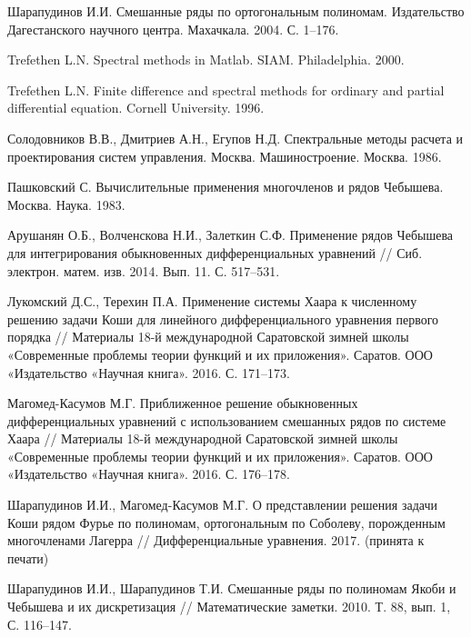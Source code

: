 \begin{thebibliography}{1}
{Шарапудинов И.И.}
Смешанные ряды по ортогональным полиномам. Издательство Дагестанского научного центра. Махачкала. 2004. С. 1--176.

{Trefethen L.N.}
Spectral methods in Matlab. SIAM. Philadelphia. 2000.

{Trefethen L.N.}
Finite difference and spectral methods for ordinary and partial differential equation. Cornell University. 1996.


{Солодовников В.В., Дмитриев А.Н., Егупов Н.Д.}
Спектральные методы расчета и проектирования систем управления. Москва. Машиностроение. Москва. 1986.

{Пашковский С.}
Вычислительные применения многочленов и рядов Чебышева. Москва. Наука. 1983.

{Арушанян О.Б., Волченскова Н.И., Залеткин С.Ф.}
Применение рядов Чебышева для интегрирования обыкновенных дифференциальных уравнений // Сиб. электрон. матем. изв. 2014. Вып. 11. С. 517--531.

{Лукомский Д.С., Терехин П.А.}
Применение системы Хаара к численному решению задачи Коши для линейного дифференциального уравнения первого порядка // Материалы 18-й международной Саратовской зимней школы «Современные проблемы теории функций и их приложения».  Саратов. ООО «Издательство «Научная книга». 2016. С. 171--173.


{Магомед-Касумов М.Г.}
Приближенное решение обыкновенных дифференциальных уравнений с использованием смешанных рядов по системе Хаара // Материалы 18-й международной Саратовской зимней школы «Современные проблемы теории функций и их приложения». Саратов. ООО «Издательство «Научная книга». 2016. С. 176--178.

{Шарапудинов И.И., Магомед-Касумов М.Г.}
О представлении решения задачи Коши  рядом Фурье  по полиномам, ортогональным по  Соболеву, порожденным многочленами Лагерра // Дифференциальные уравнения. 2017. (принята к печати)







{Шарапудинов И.И., Шарапудинов Т.И.}
Смешанные ряды по полиномам Якоби и Чебышева и их дискретизация // Математические заметки. 2010. Т. 88, вып. 1, С. 116--147.




\end{thebibliography}
